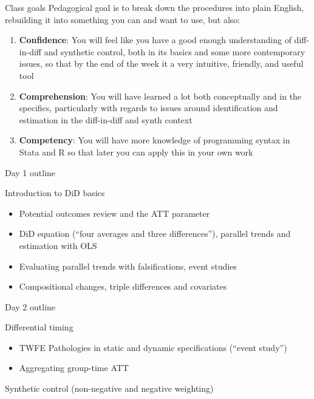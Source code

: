 \documentclass{beamer}
\begin{document}
\begin{frame}{Class goals}
Pedagogical goal is to break down the procedures into plain English, rebuilding it into something you can and want to use, but also:

  \begin{enumerate}
    \item \textbf{Confidence}: You will feel like you have a good enough understanding of diff-in-diff and synthetic control, both in its basics and some more contemporary issues, so that by the end of the week it a very intuitive, friendly, and useful tool
    \item \textbf{Comprehension}: You will have learned a lot both conceptually and in the specifics, particularly with regards to issues around identification and estimation in the diff-in-diff and synth context
    \item \textbf{Competency}: You will have more knowledge of programming syntax in Stata and R so that later you can apply this in your own work
  \end{enumerate}

\end{frame}



\begin{frame}{Day 1 outline}

Introduction to DiD basics 
	\begin{itemize}
	\item Potential outcomes review and the ATT parameter
	\item DiD equation (``four averages and three differences''), parallel trends and estimation with OLS
	\item Evaluating parallel trends with falsifications, event studies 
	\item Compositional changes, triple differences and covariates
	\end{itemize}

\end{frame}


\begin{frame}{Day 2 outline}

 Differential timing
	\begin{itemize}
	\item TWFE Pathologies in static and dynamic specifications (``event study'')
	\item Aggregating group-time ATT
	\end{itemize}

\bigskip

Synthetic control (non-negative and negative weighting)	

\end{frame}
\end{document}

